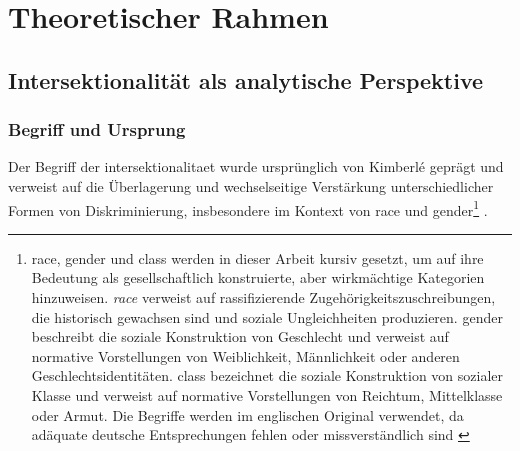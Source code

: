 
\section{Theoretischer Rahmen} \label{sec:theoretischer_rahmen}

\subsection{Intersektionalität als analytische Perspektive}

\subsubsection{Begriff und Ursprung}

Der Begriff der \gls{intersektionalitaet} wurde ursprünglich von Kimberlé \textcite{crenshawMappingMarginsIntersectionality1991} geprägt und verweist auf die Überlagerung und wechselseitige Verstärkung unterschiedlicher Formen von Diskriminierung, insbesondere im Kontext von \gls{race} und \gls{gender}\footnote{\gls{race}, \gls{gender} und \gls{class} werden in dieser Arbeit kursiv gesetzt, um auf ihre Bedeutung als gesellschaftlich konstruierte, aber wirkmächtige Kategorien hinzuweisen. \textit{race} verweist auf rassifizierende Zugehörigkeitszuschreibungen, die historisch gewachsen sind und soziale Ungleichheiten produzieren. \gls{gender} beschreibt die soziale Konstruktion von Geschlecht und verweist auf normative Vorstellungen von Weiblichkeit, Männlichkeit oder anderen Geschlechtsidentitäten. \gls{class} bezeichnet die soziale Konstruktion von sozialer Klasse und verweist auf normative Vorstellungen von Reichtum, Mittelklasse oder Armut. Die Begriffe werden im englischen Original verwendet, da adäquate deutsche Entsprechungen fehlen oder missverständlich sind \parencite[vgl.][]{hallRaceArticulationSocieties1980, butlerGenderTroubleFeminism1990}} \parencite{hancockWhenMultiplicationDoesnt2007}.


